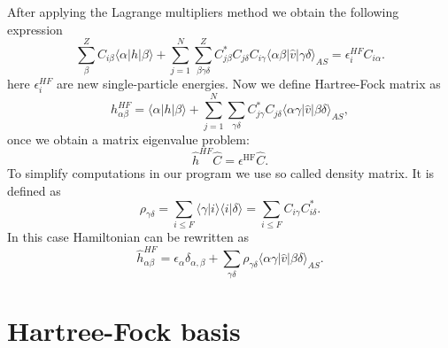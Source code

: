\documentclass[twoside,english]{uiofysmaster}
\theoremstyle{definition}
\begin{document}
After applying the Lagrange multipliers method we obtain the following expression
\begin{equation}
\sum_{\beta}^Z C_{i\beta}\langle \alpha | h | \beta \rangle+
\sum_{j=1}^N\sum_{\beta\gamma\delta}^Z C^*_{j\beta}C_{j\delta}C_{i\gamma}\langle \alpha\beta|\hat{v}|\gamma\delta\rangle_{AS}=\epsilon_i^{HF}C_{i\alpha}.
\end{equation}
here $\epsilon_i^{HF}$ are new single-particle energies. Now we define Hartree-Fock matrix as
\begin{equation}
h_{\alpha\beta}^{HF}=\langle \alpha | h | \beta \rangle+
\sum_{j=1}^N\sum_{\gamma\delta} C^*_{j\gamma}C_{j\delta}\langle \alpha\gamma|\hat{v}|\beta\delta\rangle_{AS},
\end{equation}
once we obtain a matrix eigenvalue problem:
\begin{equation} \label{eig}
\hat{h}^{HF}\hat{C}=\epsilon^{\mathrm{HF}}\hat{C}.
\end{equation}
To simplify computations in our program we use so called density matrix. It is defined as
\begin{equation} \label{dens}
\rho_{\gamma\delta}=\sum_{i\le F}\langle\gamma|i\rangle\langle i|\delta\rangle = \sum_{i\le F}C_{i\gamma}C^*_{i\delta}.
\end{equation}
In this case Hamiltonian can be rewritten as 
\begin{equation}
\hat{h}_{\alpha\beta}^{HF}=\epsilon_{\alpha}\delta_{\alpha,\beta}+
\sum_{\gamma\delta} \rho_{\gamma\delta}\langle \alpha\gamma|\hat{v}|\beta\delta\rangle_{AS}.
\end{equation}
\section{Hartree-Fock basis}
\end{document}
